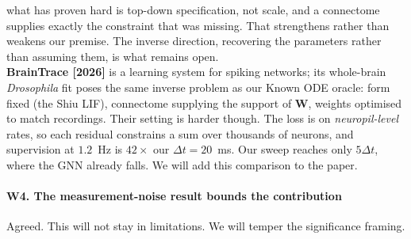 \documentclass[11pt]{article}
\newcommand{\Mat}[1]{\mathbf{#1}}
\begin{document}
what has proven hard is top-down specification, not scale, and a connectome
supplies exactly the constraint that was missing. That strengthens rather than
weakens our premise. The inverse direction, recovering the parameters rather
than assuming them, is what remains open.
\label{link10}
\\
\textbf{BrainTrace [2026]} is a learning system for spiking networks;
its whole-brain \emph{Drosophila} fit poses the same inverse problem as our
Known ODE oracle: form fixed (the Shiu LIF), connectome supplying the support of
$\Mat{W}$, weights optimised to match recordings.  Their setting is
harder though. The loss is on \emph{neuropil-level} rates, so each residual
constrains a sum over thousands of neurons, and supervision at $1.2$~Hz is
$42\times$ our $\Delta t = 20$~ms. Our sweep reaches only $5\Delta t$,
where the GNN already falls. We will add this comparison to the paper.

\paragraph{W4. The measurement-noise result bounds the contribution}
Agreed. This will not stay in limitations. We will temper the significance framing.
\end{document}

